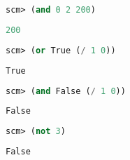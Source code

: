 \begin{lstlisting}[language=Scheme]
scm> (and 0 2 200)
\end{lstlisting}
\begin{solution}[0.15in]
\begin{lstlisting}[language=Scheme]
200
\end{lstlisting}
\end{solution}

\begin{lstlisting}[language=Scheme]
scm> (or True (/ 1 0))
\end{lstlisting}
\begin{solution}[0.15in]
\begin{lstlisting}[language=Scheme]
True
\end{lstlisting}
\end{solution}

\begin{lstlisting}[language=Scheme]
scm> (and False (/ 1 0))
\end{lstlisting}
\begin{solution}[0.15in]
\begin{lstlisting}[language=Scheme]
False
\end{lstlisting}
\end{solution}

\begin{lstlisting}[language=Scheme]
scm> (not 3)
\end{lstlisting}
\begin{solution}[0.15in]
\begin{lstlisting}[language=Scheme]
False
\end{lstlisting}
\end{solution}
